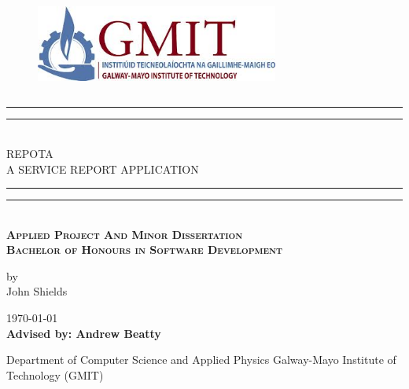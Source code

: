 \documentclass{book}
\newcommand*{\customTitle}{\begingroup %
\centering %
\vspace*{\baselineskip} %

\rule{\textwidth}{1.6pt}\vspace*{-\baselineskip}\vspace*{2pt} %
\rule{\textwidth}{0.4pt}\\[\baselineskip] %

{\Large REPOTA \\[2ex] A SERVICE REPORT APPLICATION}\\[0.2\baselineskip] %


\rule{\textwidth}{0.4pt}\vspace*{-\baselineskip}\vspace{3.2pt} %
\rule{\textwidth}{1.6pt}\\[\baselineskip] %
\scshape %
\Large \textbf{Applied Project And Minor Dissertation}\\
\textbf{Bachelor of Honours in Software Development}\par  
\normalsize
\vspace*{2\baselineskip} %

{by \\ John Shields\par}

\vspace*{2\baselineskip} %
\vfill %
{\scshape \today} \\[0.3\baselineskip] %

{\textbf{Advised by: Andrew Beatty}}\par %

{Department of Computer Science and Applied Physics Galway-Mayo Institute of Technology (GMIT)}\par %


\endgroup}
\begin{document}
 
\begin{figure}
\begin{center}
\includegraphics[width=8cm,height=3.3cm,keepaspectratio]{images/misc/gmit-logo.jpg}
\end{center}
\end{figure}
\customTitle 
\tableofcontents
\listoffigures
{} 










\end{document}
